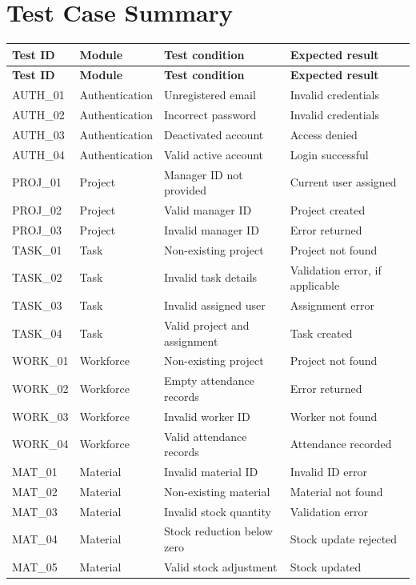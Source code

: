 \documentclass[11pt,a4paper]{article}
\begin{document}
\section{Test Case Summary}
\begin{center}
\small\renewcommand{\arraystretch}{1.25}
\begin{longtable}{>{\raggedright\arraybackslash}p{2.1cm}>{\raggedright\arraybackslash}p{2.6cm}>{\raggedright\arraybackslash}p{4.6cm}>{\raggedright\arraybackslash}p{4.2cm}}
\toprule
\rowcolor{gray!14}\textbf{Test ID} & \textbf{Module} & \textbf{Test condition} & \textbf{Expected result}\\
\midrule
\endfirsthead
\toprule
\rowcolor{gray!14}\textbf{Test ID} & \textbf{Module} & \textbf{Test condition} & \textbf{Expected result}\\
\midrule
\endhead
\bottomrule
\endfoot
AUTH\_01 & Authentication & Unregistered email & Invalid credentials\\
AUTH\_02 & Authentication & Incorrect password & Invalid credentials\\
AUTH\_03 & Authentication & Deactivated account & Access denied\\
AUTH\_04 & Authentication & Valid active account & Login successful\\
PROJ\_01 & Project & Manager ID not provided & Current user assigned\\
PROJ\_02 & Project & Valid manager ID & Project created\\
PROJ\_03 & Project & Invalid manager ID & Error returned\\
TASK\_01 & Task & Non-existing project & Project not found\\
TASK\_02 & Task & Invalid task details & Validation error, if applicable\\
TASK\_03 & Task & Invalid assigned user & Assignment error\\
TASK\_04 & Task & Valid project and assignment & Task created\\
WORK\_01 & Workforce & Non-existing project & Project not found\\
WORK\_02 & Workforce & Empty attendance records & Error returned\\
WORK\_03 & Workforce & Invalid worker ID & Worker not found\\
WORK\_04 & Workforce & Valid attendance records & Attendance recorded\\
MAT\_01 & Material & Invalid material ID & Invalid ID error\\
MAT\_02 & Material & Non-existing material & Material not found\\
MAT\_03 & Material & Invalid stock quantity & Validation error\\
MAT\_04 & Material & Stock reduction below zero & Stock update rejected\\
MAT\_05 & Material & Valid stock adjustment & Stock updated\\
\end{longtable}
\end{center}
\end{document}
